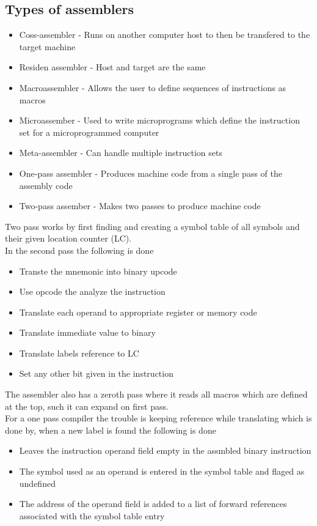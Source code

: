 \documentclass[12pt, a4paper]{article}
\begin{document}
		\subsection{Types of assemblers}
			\begin{itemize}
				\item Coss-assembler - Runs on another computer host to then be transfered to the target machine
				\item Residen assembler - Host and target are the same
				\item Macroassembler - Allows the user to define sequences of instructions as macros
				\item Microassember - Used to write microprograms which define the instruction set for a microprogrammed computer
				\item Meta-assembler - Can handle multiple instruction sets
				\item One-pass assembler - Produces machine code from a single pass of the assembly code
				\item Two-pass assember - Makes two passes to produce machine code
			\end{itemize}
			Two pass works by first finding and creating a symbol table of all symbols and their given location counter (LC).\\
			In the second pass the following is done
			\begin{itemize}
				\item Transte the mnemonic into binary upcode
				\item Use opcode the analyze the instruction
				\item Translate each operand to appropriate register or memory code
				\item Translate immediate value to binary
				\item Translate labels reference to LC 
				\item Set any other bit given in the instruction
			\end{itemize}
			The assembler also has a zeroth pass where it reads all macros which are defined at the top, such it can expand on first pass.\\[4mm]
			For a one pass compiler the trouble is keeping reference while translating which is done by, when a new label is found the following is done
			\begin{itemize}
				\item Leaves the instruction operand field empty in the assmbled binary instruction
				\item The symbol used as an operand is entered in the symbol table and flaged as undefined
				\item The address of the operand field is added to a list of forward references associated with the symbol table entry
			\end{itemize}
\end{document}
